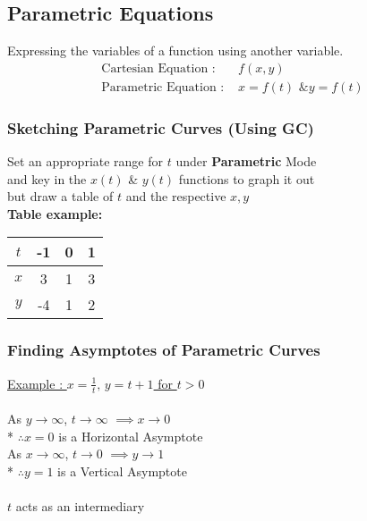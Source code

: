 \documentclass[../main.tex]{subfiles}
\begin{document}
\subsection{Parametric Equations}
Expressing the variables of a function using another variable.
\begin{align*}
    \text{Cartesian Equation : }& f(x,y) \\
    \text{Parametric Equation : }& x=f(t) \text{ \& } y=f(t)
\end{align*}
\subsubsection{Sketching Parametric Curves (Using GC)}
Set an appropriate range for \(t\) under \textbf{Parametric} Mode \\
and key in the \(x(t)\) \& \(y(t)\) functions to graph it out \\
but draw a table of \(t\) and the respective \(x,y\) \\
\textbf{Table example:} \\
\begin{tabular}{ | c | c | c | c | }
    \hline
    \(t\) & -1 & 0 & 1 \\
    \hline
    \(x\) & 3 & 1 & 3 \\
    \hline
    \(y\) & -4 & 1 & 2 \\
    \hline
\end{tabular}

\subsubsection{Finding Asymptotes of Parametric Curves}
\underline{Example : \(\displaystyle x=\frac{1}{t}, \, y=t+1\) for \(t>0\)} \\\\
As \(y \to \infty\), \(t \to \infty\) \(\implies x \to 0\) \\* \(\therefore x=0\) is a Horizontal Asymptote \\
As \(x \to \infty\), \(t \to 0\) \(\implies y \to 1\) \\* \(\therefore y=1\) is a Vertical Asymptote \\\\
\(t\) acts as an intermediary
\end{document}
